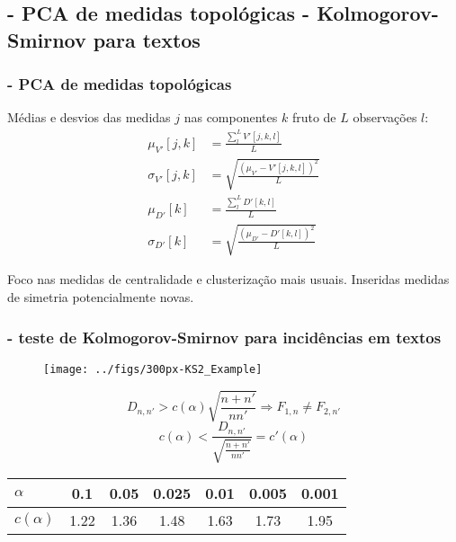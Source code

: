 \documentclass[10pt]{beamer}
\begin{document}
\begin{frame}
\subsection{- PCA de medidas topológicas \;\; - Kolmogorov-Smirnov para textos}
\frametitle{- PCA de medidas topológicas}
Médias e desvios das medidas $j$ nas componentes $k$ fruto de $L$ observações $l$:
\begin{align}\label{eq:pca}
\mu_{V'}[j,k]   &=\frac{\sum_l^L V'[j,k,l]}{L}\nonumber\\
\sigma_{V'}[j,k]&=\sqrt{\frac{(\mu_{V'}-V'[j,k,l])^2}{L}}\\\nonumber
\mu_{D'}[k]&=\frac{\sum_l^L D'[k,l]}{L}\\\nonumber
\sigma_{D'}[k]&=\sqrt{\frac{(\mu_{D'}-D'[k,l])^2}{L}}
\end{align}

Foco nas medidas de centralidade e clusterização mais usuais. 
Inseridas medidas de simetria potencialmente novas.

\end{frame}
\begin{frame}
\frametitle{- teste de Kolmogorov-Smirnov para incidências em textos}

\begin{figure}[h!]
    \centering
    \texttt{[image: ../figs/300px-KS2\_Example]}
\end{figure}



\begin{equation}\label{eq:ks}
D_{n,n'} > c(\alpha)\sqrt{\frac{n+n'}{nn'}} \Rightarrow F_{1,n} \neq F_{2,n'}
\end{equation}
\begin{equation}\label{eq:ks}
c(\alpha) < \frac{D_{n,n'}}{\sqrt{\frac{n+n'}{nn'}}} = c'(\alpha)
\end{equation}
\begin{table}[H]
\centering
\small
\begin{tabular}{|l||c|c|c|c|c|c|}\hline
$\alpha$    & 0.1  & 0.05 & 0.025 & 0.01 & 0.005 & 0.001 \\\hline
$c(\alpha)$ & 1.22 & 1.36 & 1.48  & 1.63 & 1.73  & 1.95  \\\hline
\end{tabular}
\end{table}
\end{frame}
\end{document}

